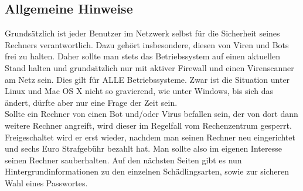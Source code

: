 \subsection{Allgemeine Hinweise}
\label{allgemeines_sicher}
Grundsätzlich ist jeder Benutzer im Netzwerk selbst für die Sicherheit seines Rechners verantwortlich. Dazu gehört insbesondere, diesen von Viren und Bots frei zu halten. Daher sollte man stets das Betriebssystem auf einen aktuellen Stand halten und grundsätzlich nur mit aktiver Firewall und einen Virenscanner am Netz sein. Dies gilt für ALLE Betriebssysteme. Zwar ist die Situation unter Linux und Mac OS X nicht so gravierend, wie unter Windows, bis sich das ändert, dürfte aber nur eine Frage der Zeit sein. \\
Sollte ein Rechner von einen Bot und/oder Virus befallen sein, der von
dort dann weitere Rechner angreift, wird dieser im Regelfall vom
Rechenzentrum gesperrt. Freigeschaltet wird er erst wieder, nachdem
man seinen Rechner neu eingerichtet und sechs Euro Strafgebühr bezahlt
hat. Man sollte also im eigenen Interesse seinen Rechner
sauberhalten. Auf den nächsten Seiten gibt es nun
Hintergrundinformationen zu den einzelnen Schädlingsarten, sowie zur
sicheren Wahl eines Passwortes.

